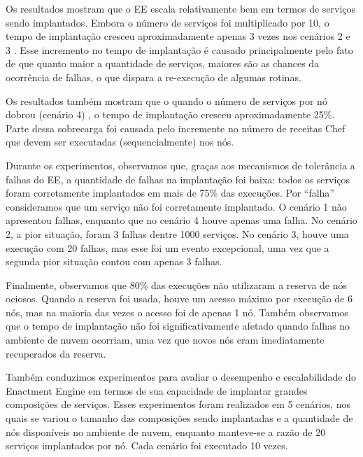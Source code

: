 
Os resultados mostram que o EE escala relativamente bem em termos de serviços sendo implantados.
Embora o número de serviços foi multiplicado por 10, o tempo de implantação
cresceu aproximadamente apenas 3 vezes nos cenários 2 e 3 .
Esse incremento no tempo de implantação é causado principalmente pelo fato
de que quanto maior a quantidade de serviços, maiores são as chances da ocorrência de falhas,
o que dispara a re-execução de algumas rotinas. 

Os resultados também mostram que o quando o número de serviços por nó dobrou (cenário 4)
,
o tempo de implantação cresceu aproximadamente 25\%. Parte dessa sobrecarga foi causada
pelo incremente no número de receitas Chef que devem ser executadas (sequencialmente) nos nós.

Durante os experimentos, observamos que, graças aos mecanismos de tolerância a falhas do EE,
a quantidade de falhas na implantação foi baixa: todos os serviços foram corretamente implantados em mais
de 75\% das execuções.
Por ``falha'' consideramos que um serviço não foi corretamente implantado.
O cenário 1 não apresentou falhas,
enquanto que no cenário 4 houve apenas uma falha.
No cenário 2, a pior situação, foram 3 falhas dentre 1000 serviços.
No cenário 3, houve uma execução com 20 falhas, mas esse foi um evento excepcional,
uma vez que a segunda pior situação contou com apenas 3 falhas.


Finalmente, observamos que 80\% das execuções não utilizaram a reserva de nós ociosos.
Quando a reserva foi usada, houve um acesso máximo por execução de 6 nós,
mas na maioria das vezes o acesso foi de apenas 1 nó.
Também observamos que o tempo de implantação não foi significativamente afetado
quando falhas no ambiente de nuvem ocorriam,
uma vez que novos nós eram imediatamente recuperados da reserva.



Também conduzimos experimentos para avaliar o desempenho e escalabilidade do Enactment Engine
em termos de sua capacidade de implantar grandes composições de serviços.
Esses experimentos foram realizados em 5 cenários, nos quais se variou o tamanho das composições sendo implantadas
e a quantidade de nós disponíveis no ambiente de nuvem, enquanto manteve-se a razão de 20 serviços implantados por nó.
Cada cenário foi executado 10 vezes.

